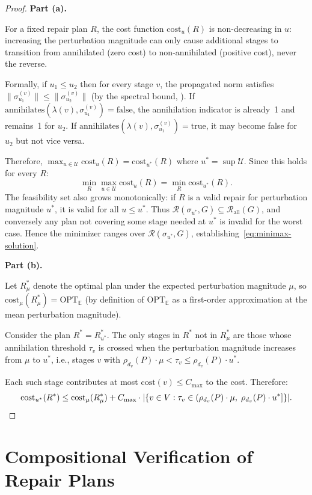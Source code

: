 \documentclass[11pt,a4paper]{article}
\theoremstyle{definition}
\newcommand{\ann}{\mathrm{annihilates}}
\newcommand{\cost}{\mathrm{cost}}
\newcommand{\OPT}{\mathrm{OPT}}
\newcommand{\bbE}{\mathbb{E}}
\newcommand{\cR}{\mathcal{R}}
\begin{document}
\begin{proof}
\textbf{Part (a).}

For a fixed repair plan $R$, the cost function $\cost_u(R)$ is
non-decreasing in $u$: increasing the perturbation magnitude can only cause
additional stages to transition from annihilated (zero cost) to non-annihilated
(positive cost), never the reverse.

Formally, if $u_1 \leq u_2$ then for every stage $v$, the propagated norm
satisfies $\|\sigma_{u_1}^{(v)}\| \leq \|\sigma_{u_2}^{(v)}\|$ (by the
spectral bound, ).  If $\ann(\lambda(v),
\sigma_{u_1}^{(v)}) = \mathrm{false}$, the annihilation indicator is already~1
and remains~1 for $u_2$.  If $\ann(\lambda(v), \sigma_{u_1}^{(v)}) =
\mathrm{true}$, it may become false for $u_2$ but not vice versa.

Therefore, $\max_{u \in \mathcal{U}} \cost_u(R) = \cost_{u^*}(R)$ where
$u^* = \sup \mathcal{U}$.  Since this holds for every $R$:
\[
  \min_R \max_{u \in \mathcal{U}} \cost_u(R)
  = \min_R \cost_{u^*}(R).
\]
The feasibility set also grows monotonically: if $R$ is a valid repair for
perturbation magnitude $u^*$, it is valid for all $u \leq u^*$.  Thus
$\cR(\sigma_{u^*}, G) \subseteq \cR_{\mathrm{all}}(G)$, and conversely any
plan not covering some stage needed at $u^*$ is invalid for the worst case.
Hence the minimizer ranges over $\cR(\sigma_{u^*}, G)$,
establishing~\eqref{eq:minimax-solution}.

\textbf{Part (b).}

Let $R^*_\mu$ denote the optimal plan under the expected perturbation magnitude
$\mu$, so $\cost_\mu(R^*_\mu) = \OPT_{\bbE}$ (by definition of $\OPT_{\bbE}$
as a first-order approximation at the mean perturbation magnitude).

Consider the plan $R^* = R^*_{u^*}$.  The only stages in $R^*$ not in
$R^*_\mu$ are those whose annihilation threshold $\tau_v$ is crossed when the
perturbation magnitude increases from $\mu$ to $u^*$, i.e., stages $v$ with
$\rho_{d_v}(P) \cdot \mu < \tau_v \leq \rho_{d_v}(P) \cdot u^*$.

Each such stage contributes at most $\cost(v) \leq C_{\max}$ to the cost.
Therefore:
\[
  \cost_{u^*}(R^*)
  \leq \cost_\mu(R^*_\mu) +
    C_{\max} \cdot |\{v \in V : \tau_v \in
    (\rho_{d_v}(P) \cdot \mu,\; \rho_{d_v}(P) \cdot u^*]\}|. \qedhere
\]
\end{proof}


\section{Compositional Verification of Repair Plans}
\label{sec:bisimulation}
\end{document}

